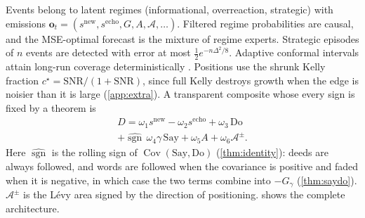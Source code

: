 \documentclass[10pt,twocolumn,letterpaper]{article}
\theoremstyle{plain}
\theoremstyle{definition}
\theoremstyle{remark}
\DeclareMathOperator{\sgn}{sgn}
\DeclareMathOperator{\Cov}{Cov}
\begin{document}
Events belong to latent regimes (informational, overreaction, strategic) with emissions $\bm o_t=(s^{\mathrm{new}},s^{\mathrm{echo}},G,A,\mathcal{A},\dots)$. Filtered regime probabilities are causal, and the MSE-optimal forecast is the mixture of regime experts. Strategic episodes of $n$ events are detected with error at most $\tfrac12e^{-n\Delta^2/8}$. Adaptive conformal intervals attain long-run coverage deterministically \citep{gibbs2021}. Positions use the shrunk Kelly fraction $c^\star=\mathrm{SNR}/(1+\mathrm{SNR})$, since full Kelly destroys growth when the edge is noisier than it is large (\cref{app:extra}). A transparent composite whose every sign is fixed by a theorem is
\begin{multline*}
  D=\omega_1s^{\mathrm{new}}-\omega_2s^{\mathrm{echo}}+\omega_3\,\mathrm{Do}\\
  +\widehat{\sgn}\,\omega_4\gamma\,\mathrm{Say}+\omega_5A+\omega_6\mathcal{A}^{\pm}.
\end{multline*}
Here $\widehat{\sgn}$ is the rolling sign of $\Cov(\text{Say},\text{Do})$ (\cref{thm:identity}): deeds are always followed, and words are followed when the covariance is positive and faded when it is negative, in which case the two terms combine into $-G_\gamma$ (\cref{thm:saydo}). $\mathcal{A}^\pm$ is the L\'evy area signed by the direction of positioning.  shows the complete architecture.
\end{document}
